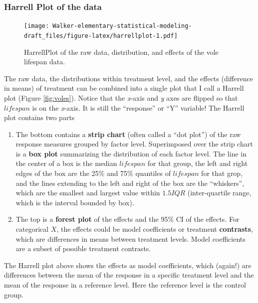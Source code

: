 \documentclass[]{book}
\providecommand{\tightlist}{%
  \setlength{\itemsep}{0pt}\setlength{\parskip}{0pt}}
\begin{document}
\subsubsection{Harrell Plot of the data}\label{harrell-plot-of-the-data}

\begin{figure}
\centering
\texttt{[image: Walker-elementary-statistical-modeling-draft\_files/figure-latex/harrellplot-1.pdf]}
\caption{\label{fig:harrellplot}HarrellPlot of the raw data, distribution,
and effects of the vole lifespan data.}
\end{figure}

The raw data, the distributions within treatment level, and the effects
(difference in means) of treatment can be combined into a single plot
that I call a Harrell plot (Figure \ref{fig:voles}). Notice that the
\emph{x}-axis and \emph{y} axes are flipped so that \(lifespan\) is on
the \emph{x}-axis. It is still the ``response'' or ``Y'' variable! The
Harrell plot contains two parts

\begin{enumerate}
\def\labelenumi{\arabic{enumi}.}
\tightlist
\item
  The bottom contains a \textbf{strip chart} (often called a ``dot
  plot'') of the raw response measures grouped by factor level.
  Superimposed over the strip chart is a \textbf{box plot} summarizing
  the distribution of each factor level. The line in the center of a box
  is the median \(lifespan\) for that group, the left and right edges of
  the box are the 25\% and 75\% quantiles of \(lifespan\) for that grop,
  and the lines extending to the left and right of the box are the
  ``whiskers'', which are the smallest and largest value within
  \(1.5 IQR\) (inter-quartile range, which is the interval bounded by
  box).
\item
  The top is a \textbf{forest plot} of the effects and the 95\% CI of
  the effects. For categorical \(X\), the effects could be model
  coefficients or treatment \textbf{contrasts}, which are differences in
  means between treatment levels. Model coefficients are a subset of
  possible treatment contrasts.
\end{enumerate}

The Harrell plot above shows the effects as model coefficients, which
(again!) are differences between the mean of the response in a specific
treatment level and the mean of the response in a reference level. Here
the reference level is the control group.
\end{document}
